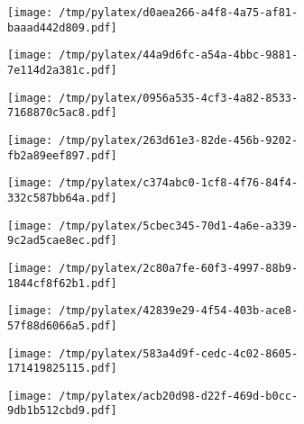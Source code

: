 \documentclass{article}
\begin{document}
\begin{figure}[htbp]
\begin{subfigure}[b]{.3\linewidth}
\texttt{[image: /tmp/pylatex/d0aea266-a4f8-4a75-af81-baaad442d809.pdf]}
\end{subfigure}
\begin{subfigure}[b]{.3\linewidth}
\texttt{[image: /tmp/pylatex/44a9d6fc-a54a-4bbc-9881-7e114d2a381c.pdf]}
\end{subfigure}
\begin{subfigure}[b]{.3\linewidth}
\texttt{[image: /tmp/pylatex/0956a535-4cf3-4a82-8533-7168870c5ac8.pdf]}
\end{subfigure}
\begin{subfigure}[b]{.3\linewidth}
\texttt{[image: /tmp/pylatex/263d61e3-82de-456b-9202-fb2a89eef897.pdf]}
\end{subfigure}
\begin{subfigure}[b]{.3\linewidth}
\texttt{[image: /tmp/pylatex/c374abc0-1cf8-4f76-84f4-332c587bb64a.pdf]}
\end{subfigure}
\begin{subfigure}[b]{.3\linewidth}
\texttt{[image: /tmp/pylatex/5cbec345-70d1-4a6e-a339-9c2ad5cae8ec.pdf]}
\end{subfigure}
\begin{subfigure}[b]{.3\linewidth}
\texttt{[image: /tmp/pylatex/2c80a7fe-60f3-4997-88b9-1844cf8f62b1.pdf]}
\end{subfigure}
\begin{subfigure}[b]{.3\linewidth}
\texttt{[image: /tmp/pylatex/42839e29-4f54-403b-ace8-57f88d6066a5.pdf]}
\end{subfigure}
\begin{subfigure}[b]{.3\linewidth}
\texttt{[image: /tmp/pylatex/583a4d9f-cedc-4c02-8605-171419825115.pdf]}
\end{subfigure}
\begin{subfigure}[b]{.3\linewidth}
\texttt{[image: /tmp/pylatex/acb20d98-d22f-469d-b0cc-9db1b512cbd9.pdf]}
\end{subfigure}
\end{figure}
\end{document}
